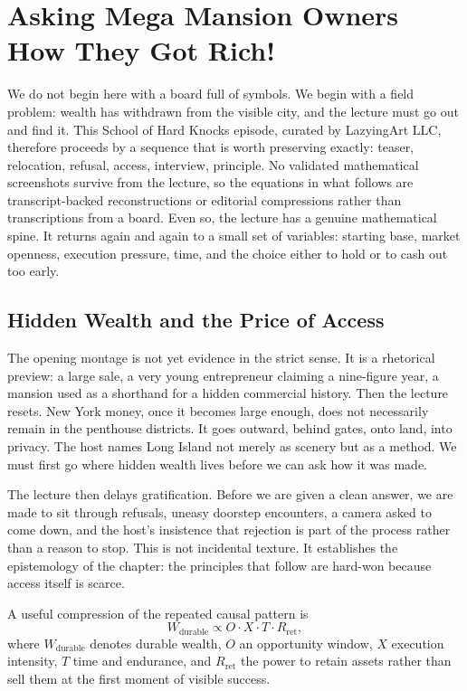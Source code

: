 \chapter{Asking Mega Mansion Owners How They Got Rich!}

We do not begin here with a board full of symbols. We begin with a field problem: wealth has withdrawn from the visible city, and the lecture must go out and find it. This School of Hard Knocks episode, curated by LazyingArt LLC, therefore proceeds by a sequence that is worth preserving exactly: teaser, relocation, refusal, access, interview, principle. No validated mathematical screenshots survive from the lecture, so the equations in what follows are transcript-backed reconstructions or editorial compressions rather than transcriptions from a board. Even so, the lecture has a genuine mathematical spine. It returns again and again to a small set of variables: starting base, market openness, execution pressure, time, and the choice either to hold or to cash out too early.

\section{Hidden Wealth and the Price of Access}

The opening montage is not yet evidence in the strict sense. It is a rhetorical preview: a large sale, a very young entrepreneur claiming a nine-figure year, a mansion used as a shorthand for a hidden commercial history. Then the lecture resets. New York money, once it becomes large enough, does not necessarily remain in the penthouse districts. It goes outward, behind gates, onto land, into privacy. The host names Long Island not merely as scenery but as a method. We must first go where hidden wealth lives before we can ask how it was made.

The lecture then delays gratification. Before we are given a clean answer, we are made to sit through refusals, uneasy doorstep encounters, a camera asked to come down, and the host's insistence that rejection is part of the process rather than a reason to stop. This is not incidental texture. It establishes the epistemology of the chapter: the principles that follow are hard-won because access itself is scarce.

A useful compression of the repeated causal pattern is
\begin{equation}
W_{\mathrm{durable}} \propto O \cdot X \cdot T \cdot R_{\mathrm{ret}},
\end{equation}
where \(W_{\mathrm{durable}}\) denotes durable wealth, \(O\) an opportunity window, \(X\) execution intensity, \(T\) time and endurance, and \(R_{\mathrm{ret}}\) the power to retain assets rather than sell them at the first moment of visible success.

